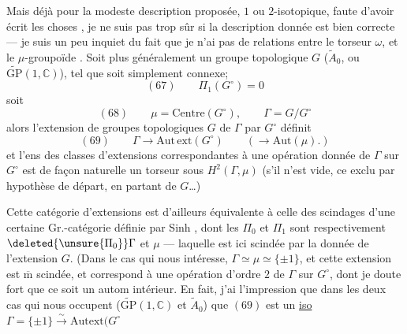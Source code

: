Mais déjà pour la modeste description proposée,
 $1$ ou $2$-isotopique, faute d'avoir écrit les
choses , je ne suis pas trop sûr si
la description donnée est bien correcte --- je
suis un peu inquiet du fait que je n'ai
pas  de  relations entre le \inserted{$\mu$-}torseur $\omega$,
et le $\mu$-groupoïde . Soit plus généralement
un groupe topologique $G$ ($\widetilde A_0$, ou $\widetilde{\mathrm{GP}}(1,\mathbb C)$),
tel que  soit simplement connexe; 
\[
(67)\qquad\Pi_1(G^\circ)=0
\]
soit
\[
(68)\qquad \mu=\mathrm{Centre}(G^\circ),\qquad\Gamma=G/G^\circ
\]
alors l'extension de groupes topologiques $G$
de $\Gamma$ par $G^\circ$ définit
\[
(69)\qquad\Gamma\longrightarrow\mathrm{Aut\,ext}(G^\circ)
\qquad(\longrightarrow\mathrm{Aut}(\mu).)
\]
et l'ens des classes d'extensions correspondantes
à une opération  donnée de $\Gamma$ sur $G^\circ$
est de façon naturelle un torseur sous
$H^2(\Gamma,\mu)$ (s'il n'est vide, ce  exclu
par hypothèse de départ, en partant de $G$\ldots)

Cette catégorie d'extensions est d'ailleurs équivalente
à celle des scindages d'une certaine
Gr.-catégorie définie par Sinh , dont les $\Pi_0$ et
$\Pi_1$ sont respectivement $\deleted{\unsure{\Pi_0}}\Gamma$ et $\mu$ --- laquelle
est  ici scindée par la donnée de l'extension
$G$. (Dans le cas qui nous intéresse,
$\Gamma\simeq\mu\simeq\{\pm1\}$, et
cette extension est $\overline{\mathrm m}$ scindée, et correspond
à une opération d'ordre $2$ de $\Gamma$ sur $G^\circ$,
dont je doute fort que ce soit un autom intérieur.
En fait, j'ai l'impression que dans les
deux cas qui nous occupent ($\widetilde{\mathrm{GP}}(1,\mathbb C)$ et
$\widetilde A_0$) que $(69)$ est un \uline{iso}
$\Gamma=\{\pm1\}\xrightarrow{\sim}\mathrm{Autext}(G^\circ$

